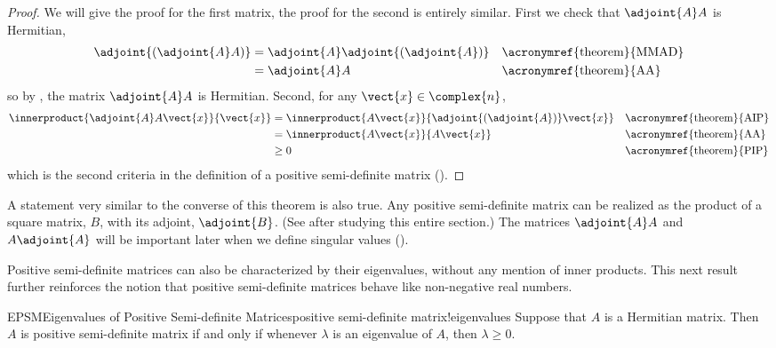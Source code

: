 \begin{proof}
We will give the proof for the first matrix, the proof for the second is entirely similar.  First we check that $\adjoint{A}A$ is Hermitian,
%
\begin{align*}
\adjoint{\left(\adjoint{A}A\right)}
&=\adjoint{A}\adjoint{\left(\adjoint{A}\right)}&&\text{\acronymref{theorem}{MMAD}}\\
&=\adjoint{A}A&&\text{\acronymref{theorem}{AA}}
\end{align*}
%
so by , the matrix $\adjoint{A}A$ is Hermitian.  Second, for any $\vect{x}\in\complex{n}$,
%
\begin{align*}
\innerproduct{\adjoint{A}A\vect{x}}{\vect{x}}
&=\innerproduct{A\vect{x}}{\adjoint{\left(\adjoint{A}\right)}\vect{x}}
&&\text{\acronymref{theorem}{AIP}}\\
%
&=\innerproduct{A\vect{x}}{A\vect{x}}
&&\text{\acronymref{theorem}{AA}}\\
%
&\geq 0
&&\text{\acronymref{theorem}{PIP}}
%
\end{align*}
%
which is the second criteria in the definition of a positive semi-definite matrix ().
%
\end{proof}
%
A statement very similar to the converse of this theorem is also true.  Any positive semi-definite matrix can be realized as the product of a square matrix, $B$, with its adjoint, $\adjoint{B}$.  (See  after studying this entire section.)  The matrices $\adjoint{A}A$ and $A\adjoint{A}$ will be important later when we define singular values ().\par
%
Positive semi-definite matrices can also be characterized by their eigenvalues, without any mention of inner products.  This next result further reinforces the notion that positive semi-definite matrices behave like non-negative real numbers.
%
\begin{theorem}{EPSM}{Eigenvalues of Positive Semi-definite Matrices}{positive semi-definite matrix!eigenvalues}
Suppose that $A$ is a Hermitian matrix.  Then $A$ is positive semi-definite matrix if and only if whenever  $\lambda$ is an eigenvalue of $A$, then $\lambda\geq 0$.
\end{theorem}
%
